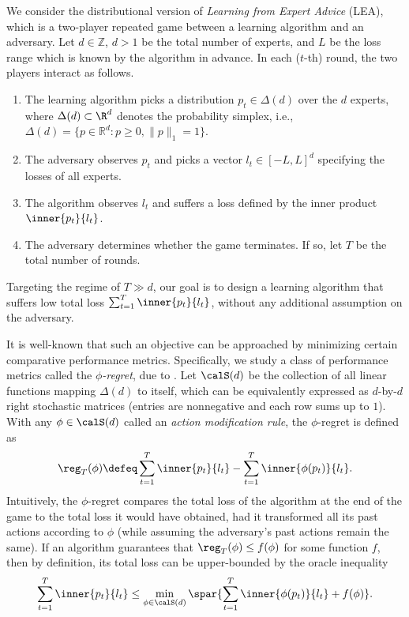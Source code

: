 \documentclass[10pt]{article}
\begin{document}
We consider the distributional version of \emph{Learning from Expert Advice} (LEA), which is a two-player repeated game between a learning algorithm and an adversary. Let $d\in\mathbb{Z}$, $d>1$ be the total number of experts, and $L$ be the loss range which is known by the algorithm in advance. In each ($t$-th) round, the two players interact as follows. 
\begin{enumerate}
\item The learning algorithm picks a distribution $p_t\in\Delta(d)$ over the $d$ experts, where $\Delta(d)\subset\R^d$ denotes the probability simplex, i.e., $\Delta(d)=\{p\in\mathbb{R}^d:p\ge 0, \|p\|_1=1\}$. 
\item The adversary observes $p_t$ and picks a vector $l_t\in[-L,L]^d$ specifying the losses of all experts.
\item The algorithm observes $l_t$ and suffers a loss defined by the inner product $\inner{p_t}{l_t}$.
\item The adversary determines whether the game terminates. If so, let $T$ be the total number of rounds.
\end{enumerate}
Targeting the regime of $T\gg d$, our goal is to design a learning algorithm that suffers low total loss $\sum_{t=1}^T\inner{p_t}{l_t}$, without any additional assumption on the adversary.

It is well-known that such an objective can be approached by minimizing certain comparative performance metrics. Specifically, we study a class of performance metrics called the $\phi$\emph{-regret}, due to \cite{greenwald2003general}. Let $\calS(d)$ be the collection of all linear functions mapping $\Delta(d)$ to itself, which can be equivalently expressed as $d$-by-$d$ right stochastic matrices (entries are nonnegative and each row sums up to $1$). With any $\phi\in\calS(d)$ called an \emph{action modification rule}, the $\phi$-regret is defined as
\begin{equation*}
\reg_T(\phi)\defeq\sum_{t=1}^T\inner{p_t}{l_t}-\sum_{t=1}^T\inner{\phi(p_t)}{l_t}. 
\end{equation*}
Intuitively, the $\phi$-regret compares the total loss of the algorithm at the end of the game to the total loss it would have obtained, had it transformed all its past actions according to $\phi$ (while assuming the adversary's past actions remain the same). If an algorithm guarantees that $\reg_T(\phi)\leq f(\phi)$ for some function $f$, then by definition, its total loss can be upper-bounded by the oracle inequality
\begin{equation}\label{eq:oracle}
\sum_{t=1}^T\inner{p_t}{l_t}\leq \min_{\phi\in\calS(d)}\spar{\sum_{t=1}^T\inner{\phi(p_t)}{l_t}+f(\phi)}.
\end{equation}
\end{document}
